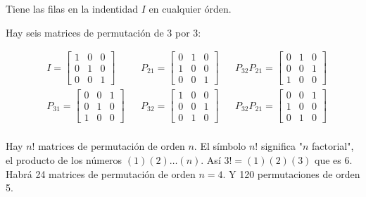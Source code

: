 \begin{definition}
	Tiene las filas en la indentidad $I$ en cualquier órden.
\end{definition}

Hay seis matrices de permutación de 3 por 3:

\begin{align*}
	 & I=\begin{bmatrix}
		     1 & 0 & 0 \\0&1&0\\0&0&1
	     \end{bmatrix} &  & P_{21}=\begin{bmatrix}
		                               0 & 1 & 0 \\1&0&0\\0&0&1
	                               \end{bmatrix} &  & P_{32}P_{21}=\begin{bmatrix}
		                                                               0 & 1 & 0 \\0&0&1\\1&0&0
	                                                               \end{bmatrix}      \\
	 & P_{31}=\begin{bmatrix}
		          0 & 0 & 1 \\0&1&0\\1&0&0
	          \end{bmatrix} &  & P_{32}=\begin{bmatrix}
		                                    1 & 0 & 0 \\0&0&1\\0&1&0
	                                    \end{bmatrix} &  & P_{32}P_{21}=\begin{bmatrix}
		                                                                    0 & 0 & 1 \\1&0&0\\0&1&0
	                                                                    \end{bmatrix} \\
\end{align*}

Hay $n!$ matrices de permutación de orden $n$. El símbolo $n!$ significa "$n$ factorial", el
producto de los números $(1) (2)\dots(n)$. Así $3! = (1) (2) (3)$ que es 6. Habrá 24
matrices de permutación de orden $n = 4$. Y 120 permutaciones de orden 5.

